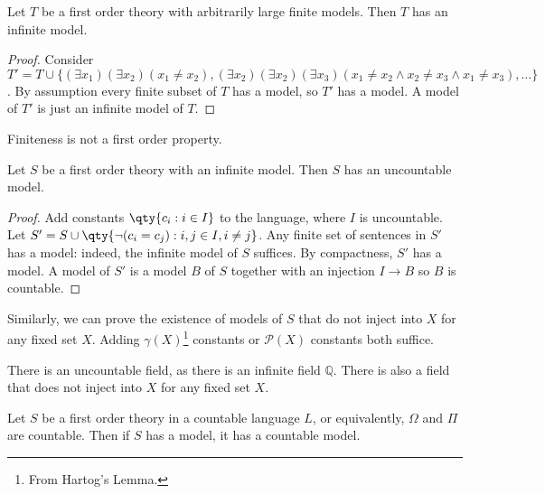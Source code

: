 \begin{corollary}
    Let $T$ be a first order theory with arbitrarily large finite models.
    Then $T$ has an infinite model.
\end{corollary}

\begin{proof}
    Consider $T' = T \cup \{(\exists x_1)(\exists x_2)(x_1 \neq x_2),(\exists x_2)(\exists x_2)(\exists x_3)(x_1 \neq x_2 \wedge x_2 \neq x_3 \wedge x_1 \neq x_3), \dots\}$.
    By assumption every finite subset of $T$ has a model, so $T'$ has a model.
    A model of $T'$ is just an infinite model of $T$.
\end{proof}

Finiteness is not a first order property.

\begin{theorem}
    Let $S$ be a first order theory with an infinite model.
    Then $S$ has an uncountable model.
\end{theorem}

\begin{proof}
    Add constants $\qty{c_i : i \in I}$ to the language, where $I$ is uncountable.
    Let $S' = S \cup \qty{\neg (c_i = c_j) : i, j \in I, i \neq j}$.
    Any finite set of sentences in $S'$ has a model: indeed, the infinite model of $S$ suffices.
    By compactness, $S'$ has a model.
    A model of $S'$ is a model $B$ of $S$ together with an injection $I \to B$ so $B$ is countable.
\end{proof}

\begin{remark}
    Similarly, we can prove the existence of models of $S$ that do not inject into $X$ for any fixed set $X$.
    Adding $\gamma(X)$\footnote{From Hartog's Lemma.} constants or $\mathcal P(X)$ constants both suffice.
\end{remark}

\begin{example}
    There is an uncountable field, as there is an infinite field $\mathbb Q$.
    There is also a field that does not inject into $X$ for any fixed set $X$.
\end{example}

\begin{theorem}
    Let $S$ be a first order theory in a countable language $L$, or equivalently, $\Omega$ and $\Pi$ are countable.
    Then if $S$ has a model, it has a countable model.
\end{theorem}


